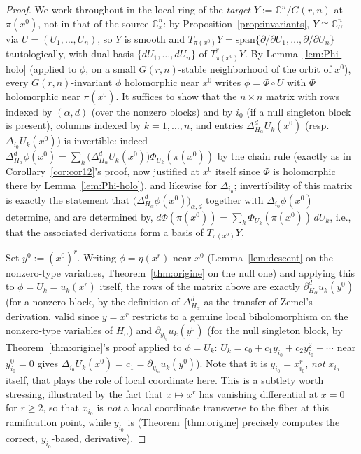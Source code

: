 \documentclass[10pt,a4paper]{amsart}
\newcommand{\CC}{\mathbb{C}}
\begin{document}
\begin{proof}
We work throughout in the local ring of the \emph{target} $Y:=\CC^n/G(r,n)$ at $\pi(x^0)$, not in that of the source $\CC^n_x$: by Proposition~\ref{prop:invariants}, $Y\cong\CC^n_U$ via $U=(U_1,\dots,U_n)$, so $Y$ is smooth and $T_{\pi(x^0)}Y=\mathrm{span}\{\partial/\partial U_1,\dots,\partial/\partial U_n\}$ tautologically, with dual basis $\{dU_1,\dots,dU_n\}$ of $T^*_{\pi(x^0)}Y$. By Lemma~\ref{lem:Phi-holo} (applied to $\phi$, on a small $G(r,n)$-stable neighborhood of the orbit of $x^0$), every $G(r,n)$-invariant $\phi$ holomorphic near $x^0$ writes $\phi=\Phi\circ U$ with $\Phi$ holomorphic near $\pi(x^0)$. It suffices to show that the $n\times n$ matrix with rows indexed by $(\alpha,d)$ (over the nonzero blocks) and by $i_0$ (if a null singleton block is present), columns indexed by $k=1,\dots,n$, and entries $\Delta_{H_\alpha}^dU_k(x^0)$ (resp.\ $\Delta_{i_0}U_k(x^0)$) is invertible: indeed $\Delta_{H_\alpha}^d\phi(x^0)=\sum_k\big(\Delta_{H_\alpha}^dU_k(x^0)\big)\Phi_{U_k}(\pi(x^0))$ by the chain rule (exactly as in Corollary~\ref{cor:cor12}'s proof, now justified at $x^0$ itself since $\Phi$ is holomorphic there by Lemma~\ref{lem:Phi-holo}), and likewise for $\Delta_{i_0}$; invertibility of this matrix is exactly the statement that $\big(\Delta_{H_\alpha}^d\phi(x^0)\big)_{\alpha,d}$ together with $\Delta_{i_0}\phi(x^0)$ determine, and are determined by, $d\Phi(\pi(x^0))=\sum_k\Phi_{U_k}(\pi(x^0))\,dU_k$, i.e., that the associated derivations form a basis of $T_{\pi(x^0)}Y$.

Set $y^0:=(x^0)^r$. Writing $\phi=\eta(x^r)$ near $x^0$ (Lemma~\ref{lem:descent} on the nonzero-type variables, Theorem~\ref{thm:origine} on the null one) and applying this to $\phi=U_k=u_k(x^r)$ itself, the rows of the matrix above are exactly $\partial_{H_\alpha}^du_k(y^0)$ (for a nonzero block, by the definition of $\Delta_{H_\alpha}^d$ as the transfer of Zemel's derivation, valid since $y=x^r$ restricts to a genuine local biholomorphism on the nonzero-type variables of $H_\alpha$) and $\partial_{y_{i_0}}u_k(y^0)$ (for the null singleton block, by Theorem~\ref{thm:origine}'s proof applied to $\phi=U_k$: $U_k=c_0+c_1y_{i_0}+c_2y_{i_0}^2+\cdots$ near $y_{i_0}^0=0$ gives $\Delta_{i_0}U_k(x^0)=c_1=\partial_{y_{i_0}}u_k(y^0)$). Note that it is $y_{i_0}=x_{i_0}^r$, \emph{not} $x_{i_0}$ itself, that plays the role of local coordinate here. This is a subtlety worth stressing, illustrated by the fact that $x\mapsto x^r$ has vanishing differential at $x=0$ for $r\ge2$, so that $x_{i_0}$ is \emph{not} a local coordinate transverse to the fiber at this ramification point, while $y_{i_0}$ is (Theorem~\ref{thm:origine} precisely computes the correct, $y_{i_0}$-based, derivative).


\end{proof}
\end{document}
